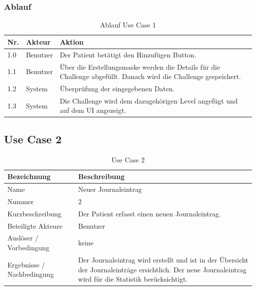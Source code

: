 \subsubsection{Ablauf}
\begin{table}[H]
 \caption{Ablauf Use Case 1}
 \begin{tabularx}{\textwidth}{|l|l|X|}
     \hline
     \textbf{Nr.} & \textbf{Akteur} & \textbf{Aktion} \\
     \hline
     1.0          & Benutzer        & Der Patient bet\"{a}tigt den Hinzuf\"{u}gen Button. \\
     \hline
     1.1          & Benutzer        & \"{U}ber die Erstellungsmaske werden die Details f\"{u}r die Challenge abgef\"{u}llt. Danach wird die Challenge gespeichert. \\
     \hline
     1.2          & System          & \"{U}berpr\"{u}fung der eingegebenen Daten.  \\
     \hline
     1.3          & System          & Die Challenge wird dem dazugeh\"{o}rigen Level angef\"{u}gt und auf dem UI angezeigt. \\
     \hline
 \end{tabularx}
 \label{table: Ablauf Use Case 1}
\end{table}

\subsection{Use Case 2}
\begin{table}[H]
 \caption{Use Case 2}
 \begin{tabularx}{\textwidth}{|l|X|}
     \hline
     \textbf{Bezeichnung}       & \textbf{Beschreibung} \\
     \hline
     Name                       & Neuer Journaleintrag \\
     \hline
     Nummer                     & 2 \\
     \hline
     Kurzbeschreibung           & Der Patient erfasst einen neuen Journaleintrag. \\
     \hline
     Beteiligte Akteure         & Benutzer \\
     \hline
     Ausl\"{o}ser / Vorbedingung    & keine \\
     \hline
     Ergebnisse / Nachbedingung & Der Journaleintrag wird erstellt und ist in der \"{U}bersicht der Journaleintr\"{a}ge ersichtlich. Der neue Journaleintrag wird f\"{u}r die Statistik ber\"{u}cksichtigt. \\
     \hline
 \end{tabularx}
 \label{table: Use Case 2}
\end{table}

